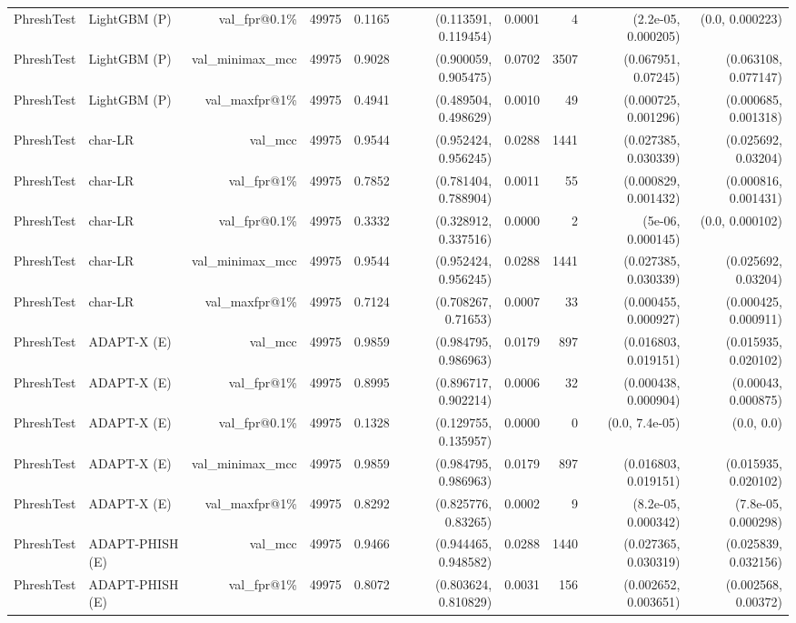 \begin{table}[t]
\begin{tabular}{llrrrrrrrr}
PhreshTest & LightGBM (P) & val\_fpr@0.1\% & 49975 & 0.1165 & (0.113591, 0.119454) & 0.0001 & 4 & (2.2e-05, 0.000205) & (0.0, 0.000223) \\
PhreshTest & LightGBM (P) & val\_minimax\_mcc & 49975 & 0.9028 & (0.900059, 0.905475) & 0.0702 & 3507 & (0.067951, 0.07245) & (0.063108, 0.077147) \\
PhreshTest & LightGBM (P) & val\_maxfpr@1\% & 49975 & 0.4941 & (0.489504, 0.498629) & 0.0010 & 49 & (0.000725, 0.001296) & (0.000685, 0.001318) \\
PhreshTest & char-LR & val\_mcc & 49975 & 0.9544 & (0.952424, 0.956245) & 0.0288 & 1441 & (0.027385, 0.030339) & (0.025692, 0.03204) \\
PhreshTest & char-LR & val\_fpr@1\% & 49975 & 0.7852 & (0.781404, 0.788904) & 0.0011 & 55 & (0.000829, 0.001432) & (0.000816, 0.001431) \\
PhreshTest & char-LR & val\_fpr@0.1\% & 49975 & 0.3332 & (0.328912, 0.337516) & 0.0000 & 2 & (5e-06, 0.000145) & (0.0, 0.000102) \\
PhreshTest & char-LR & val\_minimax\_mcc & 49975 & 0.9544 & (0.952424, 0.956245) & 0.0288 & 1441 & (0.027385, 0.030339) & (0.025692, 0.03204) \\
PhreshTest & char-LR & val\_maxfpr@1\% & 49975 & 0.7124 & (0.708267, 0.71653) & 0.0007 & 33 & (0.000455, 0.000927) & (0.000425, 0.000911) \\
PhreshTest & ADAPT-X (E) & val\_mcc & 49975 & 0.9859 & (0.984795, 0.986963) & 0.0179 & 897 & (0.016803, 0.019151) & (0.015935, 0.020102) \\
PhreshTest & ADAPT-X (E) & val\_fpr@1\% & 49975 & 0.8995 & (0.896717, 0.902214) & 0.0006 & 32 & (0.000438, 0.000904) & (0.00043, 0.000875) \\
PhreshTest & ADAPT-X (E) & val\_fpr@0.1\% & 49975 & 0.1328 & (0.129755, 0.135957) & 0.0000 & 0 & (0.0, 7.4e-05) & (0.0, 0.0) \\
PhreshTest & ADAPT-X (E) & val\_minimax\_mcc & 49975 & 0.9859 & (0.984795, 0.986963) & 0.0179 & 897 & (0.016803, 0.019151) & (0.015935, 0.020102) \\
PhreshTest & ADAPT-X (E) & val\_maxfpr@1\% & 49975 & 0.8292 & (0.825776, 0.83265) & 0.0002 & 9 & (8.2e-05, 0.000342) & (7.8e-05, 0.000298) \\
PhreshTest & ADAPT-PHISH (E) & val\_mcc & 49975 & 0.9466 & (0.944465, 0.948582) & 0.0288 & 1440 & (0.027365, 0.030319) & (0.025839, 0.032156) \\
PhreshTest & ADAPT-PHISH (E) & val\_fpr@1\% & 49975 & 0.8072 & (0.803624, 0.810829) & 0.0031 & 156 & (0.002652, 0.003651) & (0.002568, 0.00372) \\

\end{tabular}
\end{table}
